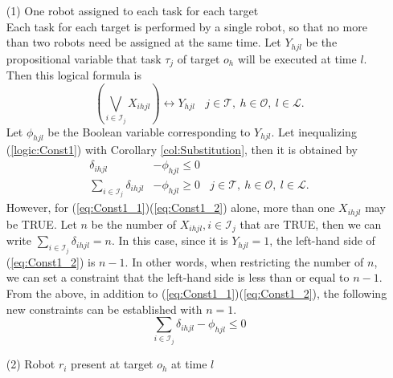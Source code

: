 \documentclass[]{interact}
\theoremstyle{plain}%
\theoremstyle{definition}
\theoremstyle{remark}
\begin{document}
\begin{itemize}
    \item[(1)] One robot assigned to each task for each target \mbox{}\\
            Each task for each target is performed by a single robot, so that no more than two robots need be assigned at the same time.
            Let $Y_{hjl}$ be the propositional variable that task $\tau_j$ of target $o_h$ will be executed at time $l$. 
            Then this logical formula is 
            \begin{equation}\label{logic:Const1}
                \left(\bigvee_{i\in\mathcal{I}_j}X_{ihjl}\right)\leftrightarrow Y_{hjl}~~~~j\in\mathcal{T},~h\in\mathcal{O},~l\in\mathcal{L}.
            \end{equation}
            Let $\phi_{hjl}$ be the Boolean variable corresponding to $Y_{hjl}$.
            Let inequalizing (\ref{logic:Const1}) with Corollary \ref{col:Substitution}, then it is obtained by
            \begin{align}
                \label{eq:Const1_1}\delta_{ihjl}&-\phi_{hjl}\le 0 \\
                \label{eq:Const1_2}\sum_{i\in\mathcal{I}_j}\delta_{ihjl}&-\phi_{hjl} \ge 0~~~~j\in\mathcal{T},~h\in\mathcal{O},~l\in\mathcal{L}.
            \end{align}
            However, for (\ref{eq:Const1_1})(\ref{eq:Const1_2}) alone, more than one $X_{ihjl}$ may be TRUE. 
            Let $n$ be the number of $X_{ihjl},i\in\mathcal{I}_j$ that are TRUE, then we can write $\sum_{i\in\mathcal{I}_j}\delta_{ihjl}=n$.
            In this case, since it is $Y_{hjl}=1$, the left-hand side of (\ref{eq:Const1_2}) is $n-1$. 
            In other words, when restricting the number of $n$, we can set a constraint that the left-hand side is less than or equal to $n-1$.
            From the above, in addition to (\ref{eq:Const1_1})(\ref{eq:Const1_2}), the following new constraints can be established with $n=1$.
            \begin{equation}
                \sum_{i\in\mathcal{I}_j}\delta_{ihjl}-\phi_{hjl} \le 0
            \end{equation}

    \item[(2)] Robot $r_i$ present at target $o_h$ at time $l$ \mbox{}\\
            
    \item[] 
            


\end{itemize}
\end{document}
